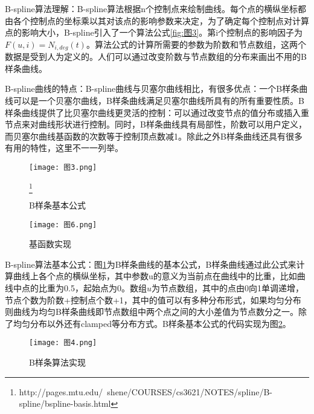 \documentclass[a4paper,UTF8]{article}
\theoremstyle{definition}
\begin{document}
\indent{}B-spline算法理解：B-spline算法根据n个控制点来绘制曲线。每个点的横纵坐标都由各个控制点的坐标乘以其对该点的影响参数来决定，为了确定每个控制点对计算点的影响大小，B-spline引入了一个算法公式\ref{fig:图3}。第i个控制点的影响因子为$F(u,i)=N_{i,deg}(t)$。算法公式的计算所需要的参数为阶数和节点数组，这两个数据是受到人为定义的。人们可以通过改变阶数与节点数组的分布来画出不用的B样条曲线。

\indent{}B-spline曲线的特点：B-spline曲线与贝塞尔曲线相比，有很多优点：一个B样条曲线可以是一个贝塞尔曲线，B样条曲线满足贝塞尔曲线所具有的所有重要性质。B样条曲线提供了比贝塞尔曲线更灵活的控制：可以通过改变节点的值分布或插入重节点来对曲线形状进行控制。同时，B样条曲线具有局部性，阶数可以用户定义，而贝塞尔曲线基函数的次数等于控制顶点数减1。除此之外B样条曲线还具有很多有用的特性，这里不一一列举。

\begin{figure}[htbp]
   \centering
   \texttt{[image: 图3.png]} %
   \caption{B样条基本公式}\footnote{http://pages.mtu.edu/~shene/COURSES/cs3621/NOTES/spline/B-spline/bspline-basis.html}
   \label{fig:图4}
\end{figure}

\begin{figure}[htbp]
   \centering
   \texttt{[image: 图6.png]} %
   \caption{基函数实现}
   \label{fig:图6}
\end{figure}


\indent{}B-spline算法基本公式：图\ref{fig:图4}为B样条曲线的基本公式，B样条曲线通过此公式来计算曲线上各个点的横纵坐标，其中参数u的意义为当前点在曲线中的比重，比如曲线中点的比重为0.5，起始点为0。数组$u$为节点数组，其中的点由0向1单调递增，节点个数为阶数+控制点个数+1，其中的值可以有多种分布形式，如果均匀分布则曲线为均匀B样条曲线即节点数组中两个点之间的大小差值为节点数分之一。除了均匀分布以外还有clamped等分布方式。B样条基本公式的代码实现为图\ref{fig:图6}。

\begin{figure}[htbp]
   \centering
   \texttt{[image: 图4.png]} %
   \caption{B样条算法实现}
   \label{fig:图5}
\end{figure}
\end{document}
